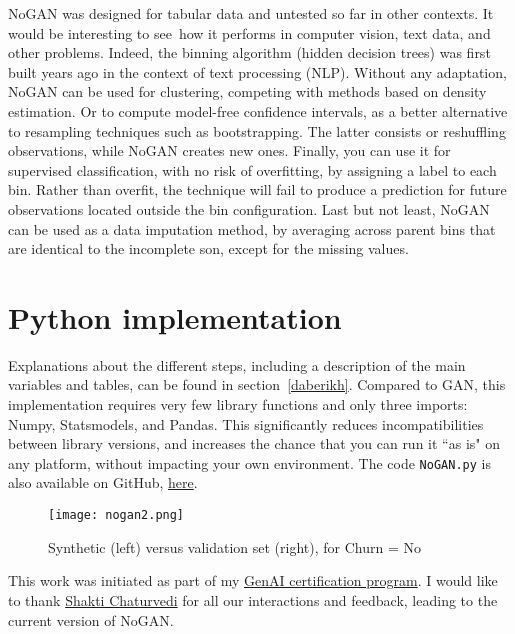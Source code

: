 \documentclass[oneside,10pt]{book}
\begin{document}
NoGAN was designed for tabular data and untested so far in other contexts. It would be interesting to see~how it performs in computer vision, text data, and
 other problems. Indeed, the binning algorithm (hidden decision trees) was first built years ago in the context
 of text processing (NLP).  Without any adaptation, NoGAN can be used for clustering, competing with methods based on density estimation. Or to compute
 model-free confidence intervals, as a better alternative to \textcolor{index}{resampling} techniques such as
 \textcolor{index}{bootstrapping}. The latter consists or reshuffling observations, while NoGAN creates new ones.
 Finally, you can use it for supervised classification, with no risk of overfitting, by assigning a label to each bin. Rather than overfit, the technique
 will fail to produce a prediction for future observations located outside the bin configuration. Last but not least, NoGAN can be used as a data imputation method, by averaging across parent bins that are identical to the incomplete son, except for the missing values.



\section{Python implementation}\label{gomornogan}

Explanations about the different steps, including a description of the main variables and tables, can be found in section~\ref{daberikh}.
Compared to GAN, this implementation requires very few library functions and only three imports: Numpy, Statsmodels, and Pandas. This significantly reduces
 incompatibilities between library versions, and increases the chance that you can run it ``as is" on any platform, without
 impacting your own environment. The code \texttt{NoGAN.py} is also available on GitHub, \href{https://github.com/VincentGranville/Main/blob/main/NoGAN.py}{here}.

\begin{figure}[H]
\centering
\texttt{[image: nogan2.png]} %
\caption{Synthetic (left) versus validation set (right), for Churn = No}
\label{fig:nogan2}
\end{figure}

This work was initiated as part of my \href{https://mltblog.com/3pWxvZK}{GenAI certification program}. I would like to thank
\href{https://www.linkedin.com/in/shakti-chaturvedi-49aab9106/}{Shakti Chaturvedi} for all our interactions and feedback, leading to the current version of NoGAN.
\vspace{1ex}
\end{document}
